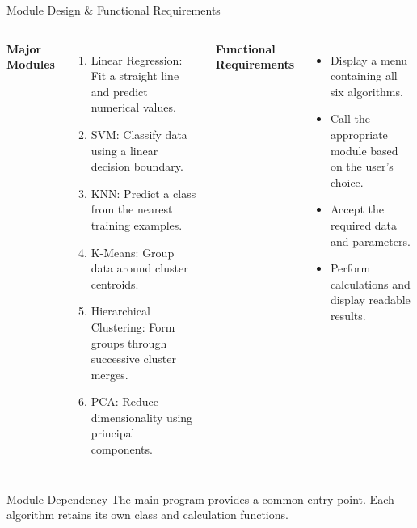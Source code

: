 \documentclass[aspectratio=169,11pt]{beamer}
\begin{document}
\begin{frame}[shrink=15]{Module Design \& Functional Requirements}
\begin{columns}[T,totalwidth=\textwidth]
\textbf{\color{GEUBlue}Major Modules}
\begin{enumerate}\itemsep3pt
\footnotesize
\item Linear Regression: Fit a straight line and predict numerical values.
\item SVM: Classify data using a linear decision boundary.
\item KNN: Predict a class from the nearest training examples.
\item K-Means: Group data around cluster centroids.
\item Hierarchical Clustering: Form groups through successive cluster merges.
\item PCA: Reduce dimensionality using principal components.
\end{enumerate}

\textbf{\color{GEUBlue}Functional Requirements}
\begin{itemize}\itemsep3pt
\footnotesize
\item Display a menu containing all six algorithms.
\item Call the appropriate module based on the user’s choice.
\item Accept the required data and parameters.
\item Perform calculations and display readable results.
\end{itemize}
\end{columns}

\vspace{2mm}

\begin{block}{Module Dependency}
\footnotesize
The main program provides a common entry point. Each algorithm retains its own class and calculation functions.
\end{block}
\end{frame}
\end{document}
